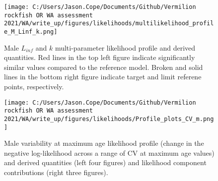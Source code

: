 \documentclass[11pt,
  english,
  a4paper,
]{article}
\begin{document}
\tagmcend\tagstructend


\begin{figure}
\centering
\texttt{[image: C:/Users/Jason.Cope/Documents/Github/Vermilion rockfish OR WA assessment 2021/WA/write\_up/figures/likelihoods/multilikelihood\_profile\_M\_Linf\_k.png]}
\caption{Male {\(L_{inf}\)\leavevmode\tagmcend\tagstructend} and {\(k\)\leavevmode\tagmcend\tagstructend} multi-parameter likelihood profile and derived quantities. Red lines in the top left figure indicate significantly similar values compared to the reference model. Broken and solid lines in the bottom right figure indicate target and limit referene points, respectively.\label{fig:Linf_k_m-profile}}
\end{figure}

\tagmcend\tagstructend


\begin{figure}
\centering
\texttt{[image: C:/Users/Jason.Cope/Documents/Github/Vermilion rockfish OR WA assessment 2021/WA/write\_up/figures/likelihoods/Profile\_plots\_CV\_m.png]}
\caption{Male variability at maximum age likelihood profile (change in the negative log-likelihood across a range of CV at maximum age values) and derived quantities (left four figures) and likelihood component contributions (right three figures).\label{fig:CVold_m-profile-combo}}
\end{figure}

\tagmcend\tagstructend

\end{document}
